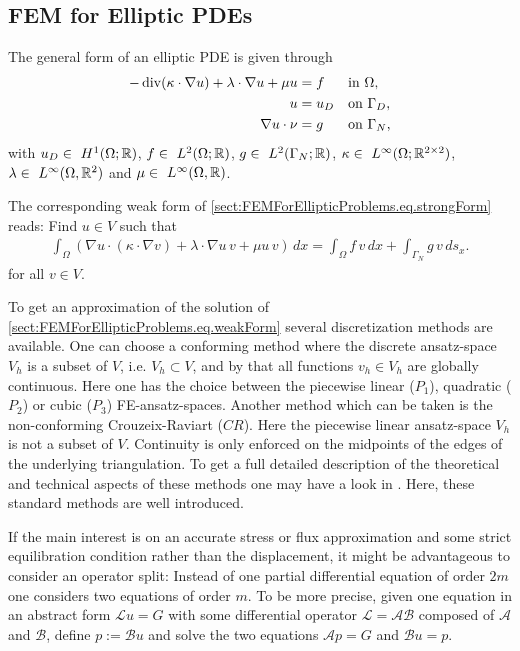 \subsection{FEM for Elliptic PDEs}

The general form of an elliptic PDE is given through
\begin{align}\label{sect:FEMForEllipticProblems.eq.strongForm}
-\operatorname{div}(\kappa\cdot\nabla u) + \lambda\cdot\nabla u + \mu u &= f &&\text{in } \Omega, \nonumber\\
u &= u_D &&\text{on } \Gamma_D, \\
\nabla u\cdot\nu &= g &&\text{on } \Gamma_N, \nonumber
\end{align}
with $u_D\in~H^1(\Omega;\mathbb{R})$, $f\in~L^2(\Omega;\mathbb{R})$, $g\in~L^2(\Gamma_N;\mathbb{R})$, $\kappa\in~L^\infty(\Omega;\mathbb{R}^{2\times 2})$, $\lambda\in~L^{\infty}(\Omega,\mathbb{R}^2)$ and $\mu\in~L^\infty(\Omega,\mathbb{R})$.

\medskip

\noindent The corresponding weak form of \eqref{sect:FEMForEllipticProblems.eq.strongForm} reads: Find $u\in V$ such that
\begin{align}
\label{sect:FEMForEllipticProblems.eq.weakForm}
	\int_\Omega \left( \nabla u\cdot(\kappa\cdot\nabla v) + \lambda\cdot\nabla u\,v + \mu u\,v\right )\,dx = \int_\Omega f\,v\,dx + \int_{\Gamma_N} g\,v\,ds_x.
\end{align}
for all $v\in V$.

\medskip

\noindent To get an approximation of the solution of \eqref{sect:FEMForEllipticProblems.eq.weakForm} several discretization methods are available. One can choose a conforming method where the discrete ansatz-space $V_h$ is a subset of $V$, i.e. $V_h\subset V$, and by that all functions $v_h\in V_h$ are globally continuous. Here one has the choice between the piecewise linear ($P_1$), quadratic ($P_2$) or cubic ($P_3$) FE-ansatz-spaces. Another method which can be taken is the non-conforming Crouzeix-Raviart ($CR$). Here the piecewise linear ansatz-space $V_h$ is not a subset of $V$. Continuity is only enforced on the midpoints of the edges of the underlying triangulation. To get a full detailed description of the theoretical and technical aspects of these methods one may have a look in \cite{Bra}. Here, these standard methods are well introduced. 

\bigskip

\noindent If the main interest is on an accurate stress or flux approximation and some strict equilibration condition rather than the displacement, it might be advantageous to consider an operator split: Instead of one partial differential equation of order $2m$ one considers two equations of order $m$. To be more precise, given one equation in an abstract form $\mathcal{L}u = G$ with some differential operator $\mathcal{L} = \mathcal{A}\mathcal{B}$ composed of $\mathcal{A}$ and $\mathcal{B}$, define $p := \mathcal{B}u$ and solve the two equations $\mathcal{A}p = G$ and $\mathcal{B}u = p$.


